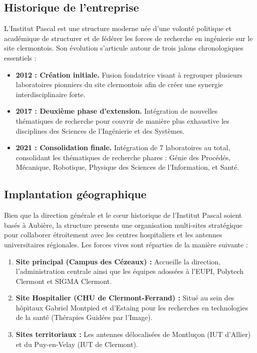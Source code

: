 \documentclass[12pt,a4paper,oneside]{report}
\begin{document}
\subsection{Historique de l'entreprise}
L'Institut Pascal est une structure moderne née d'une volonté politique et académique de structurer et de fédérer les forces de recherche en ingénierie sur le site clermontois. Son évolution s'articule autour de trois jalons chronologiques essentiels :
\begin{itemize}
    \item \textbf{2012 : Création initiale.} Fusion fondatrice visant à regrouper plusieurs laboratoires pionniers du site clermontois afin de créer une synergie interdisciplinaire forte.
    \item \textbf{2017 : Deuxième phase d'extension.} Intégration de nouvelles thématiques de recherche pour couvrir de manière plus exhaustive les disciplines des Sciences de l'Ingénierie et des Systèmes.
    \item \textbf{2021 : Consolidation finale.} Intégration de 7 laboratoires au total, consolidant les thématiques de recherche phares : Génie des Procédés, Mécanique, Robotique, Physique des Sciences de l'Information, et Santé.
\end{itemize}

\subsection{Implantation géographique}
Bien que la direction générale et le cœur historique de l'Institut Pascal soient basés à Aubière, la structure presents une organisation multi-sites stratégique pour collaborer étroitement avec les centres hospitaliers et les antennes universitaires régionales. Les forces vives sont réparties de la manière suivante :
\begin{enumerate}
    \item \textbf{Site principal (Campus des Cézeaux) :} Accueille la direction, l'administration centrale ainsi que les équipes adossées à l'EUPI, Polytech Clermont et SIGMA Clermont.
    \item \textbf{Site Hospitalier (CHU de Clermont-Ferrand) :} Situé au sein des hôpitaux Gabriel Montpied et d'Estaing pour les recherches en technologies de la santé (Thérapies Guidées par l'Image).
    \item \textbf{Sites territoriaux :} Les antennes délocalisées de Montluçon (IUT d'Allier) et du Puy-en-Velay (IUT de Clermont).
\end{enumerate}
\end{document}
